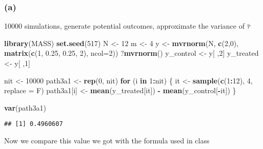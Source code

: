 \documentclass[]{article}
\newenvironment{Shaded}{\begin{snugshade}}{\end{snugshade}}
\newcommand{\ControlFlowTok}[1]{\textcolor[rgb]{0.13,0.29,0.53}{\textbf{#1}}}
\newcommand{\DataTypeTok}[1]{\textcolor[rgb]{0.13,0.29,0.53}{#1}}
\newcommand{\DecValTok}[1]{\textcolor[rgb]{0.00,0.00,0.81}{#1}}
\newcommand{\FloatTok}[1]{\textcolor[rgb]{0.00,0.00,0.81}{#1}}
\newcommand{\KeywordTok}[1]{\textcolor[rgb]{0.13,0.29,0.53}{\textbf{#1}}}
\newcommand{\NormalTok}[1]{#1}
\newcommand{\OperatorTok}[1]{\textcolor[rgb]{0.81,0.36,0.00}{\textbf{#1}}}
\newcommand{\StringTok}[1]{\textcolor[rgb]{0.31,0.60,0.02}{#1}}
\begin{document}
\hypertarget{a-1}{%
\subsubsection{(a)}\label{a-1}}

10000 simulations, generate potential outcomes, approximate the variance
of \(\hat{\tau}\)

\begin{Shaded}
\begin{Highlighting}[]
\KeywordTok{library}\NormalTok{(MASS)}
\KeywordTok{set.seed}\NormalTok{(}\DecValTok{517}\NormalTok{)}
\NormalTok{N <-}\StringTok{ }\DecValTok{12}
\NormalTok{m <-}\StringTok{ }\DecValTok{4}
\NormalTok{y <-}\StringTok{ }\KeywordTok{mvrnorm}\NormalTok{(N, }\KeywordTok{c}\NormalTok{(}\DecValTok{2}\NormalTok{,}\DecValTok{0}\NormalTok{), }\KeywordTok{matrix}\NormalTok{(}\KeywordTok{c}\NormalTok{(}\DecValTok{1}\NormalTok{, }\FloatTok{0.25}\NormalTok{, }\FloatTok{0.25}\NormalTok{, }\DecValTok{2}\NormalTok{), }\DataTypeTok{ncol=}\DecValTok{2}\NormalTok{))}
\NormalTok{?}\KeywordTok{mvrnorm}\NormalTok{()}
\NormalTok{y_control <-}\StringTok{ }\NormalTok{y[ ,}\DecValTok{2}\NormalTok{]}
\NormalTok{y_treated <-}\StringTok{ }\NormalTok{y[ ,}\DecValTok{1}\NormalTok{]}

\NormalTok{nit <-}\StringTok{ }\DecValTok{10000}
\NormalTok{path3a1 <-}\StringTok{ }\KeywordTok{rep}\NormalTok{(}\DecValTok{0}\NormalTok{, nit)}
\ControlFlowTok{for}\NormalTok{ (i }\ControlFlowTok{in} \DecValTok{1}\OperatorTok{:}\NormalTok{nit) \{}
\NormalTok{  it <-}\StringTok{ }\KeywordTok{sample}\NormalTok{(}\KeywordTok{c}\NormalTok{(}\DecValTok{1}\OperatorTok{:}\DecValTok{12}\NormalTok{), }\DecValTok{4}\NormalTok{, }\DataTypeTok{replace =}\NormalTok{ F)}
\NormalTok{  path3a1[i] <-}\StringTok{ }\KeywordTok{mean}\NormalTok{(y_treated[it]) }\OperatorTok{-}\StringTok{ }\KeywordTok{mean}\NormalTok{(y_control[}\OperatorTok{-}\NormalTok{it])}
\NormalTok{\}}

\KeywordTok{var}\NormalTok{(path3a1)}
\end{Highlighting}
\end{Shaded}

\begin{verbatim}
## [1] 0.4960607
\end{verbatim}

Now we compare this value we got with the formula used in class
\end{document}
